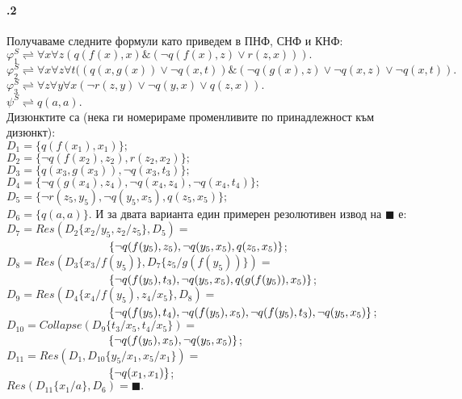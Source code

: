 \documentclass[12pt]{article}
\begin{document}
\paragraph{\hspace{0.5em} .2}
\begin{addmargin}[1em]{2em}
Получаваме следните формули като приведем в ПНФ, СНФ и КНФ: \\
$\varphi_1^S \rightleftharpoons \forall x \forall z (q(f(x), x)\&(\neg q(f(x), z)\lor r(z, x))). $ \\
$\varphi_2^S \rightleftharpoons \forall x \forall z \forall t((q(x,g(x))\lor \neg q(x,t))\&(\neg q(g(x),z) \lor \neg q(x, z) \lor \neg q(x, t)). $ \\
$\varphi_3^S \rightleftharpoons \forall z \forall y \forall x (\neg r(z,y) \lor \neg q(y,x) \lor q(z, x)). $ \\
$\psi^S \rightleftharpoons q(a,a).$ \\
Дизюнктите са (нека ги номерираме променливите по принадлежност към дизюнкт): \\
$D_1 = \{ q(f(x_1),x_1)\};$ \\
$D_2 = \{ \neg q(f(x_2),z_2), r(z_2, x_2)\};$ \\
$D_3 = \{ q(x_3, g(x_3)), \neg q(x_3, t_3)\};$ \\
$D_4 = \{ \neg q(g(x_4),z_4), \neg q(x_4, z_4), \neg q(x_4, t_4)\};$ \\
$D_5 = \{ \neg r(z_5, y_5), \neg q(y_5, x_5), q(z_5, x_5)\};$ \\
$D_6 = \{ q(a,a)\}.$ 
\vskip 0.1in
И за двата варианта един примерен резолютивен извод на $ \blacksquare $ е: \\
$ D_7 = Res(D_2\{x_2/y_5, z_2/z_5\}, D_5) = $\\$ \indent \indent \indent \indent \indent \indent \{ \neg q(f(y_5),z_5), \neg q(y_5, x_5), q(z_5, x_5) \}$; \\
$ D_8 = Res(D_3\{x_3/f(y_5)\}, D_7\{ z_5/g(f(y_5)) \}) = $\\$ \indent \indent \indent \indent \indent \indent \{ \neg q(f(y_5), t_3), \neg q(y_5, x_5), q(g(f(y_5)),x_5)\}$; \\
$ D_9 = Res(D_4\{x_4/f(y_5), z_4/x_5\}, D_8) = $\\$  \indent \indent \indent \indent \indent \indent \{ \neg q(f(y_5),t_4), \neg q(f(y_5),x_5), \neg q(f(y_5), t_3), \neg q(y_5, x_5)\}$;\\
$ D_{10} = Collapse(D_9\{t_3/x_5, t_4/x_5\}) = $\\$  \indent \indent \indent \indent \indent \indent\{\neg q(f(y_5), x_5), \neg q(y_5, x_5)\}$;\\
$ D_{11} = Res(D_1, D_{10}\{y_5/x_1, x_5/x_1 \}) = $\\$  \indent \indent \indent \indent \indent \indent  \{ \neg q(x_1, x_1) \}$;\\
$ Res(D_{11}\{x_1/a\}, D_6) = \blacksquare. $ \\
\end{addmargin}
\end{document}
